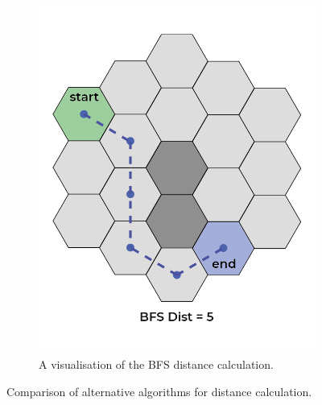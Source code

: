 \documentclass{article}
\begin{document}
\begin{figure}[]
\begin{subfigure}[b]{0.4\linewidth}
      \includegraphics[width=\linewidth]{hex-both-BFS.png}
      \caption{A visualisation of the BFS distance calculation.}
      \label{fig: hex manhattan BFS}
    \end{subfigure}
    \caption{Comparison of alternative algorithms for distance calculation.}
    \label{fig: comparison}
\end{figure}

\newpage
\end{document}
